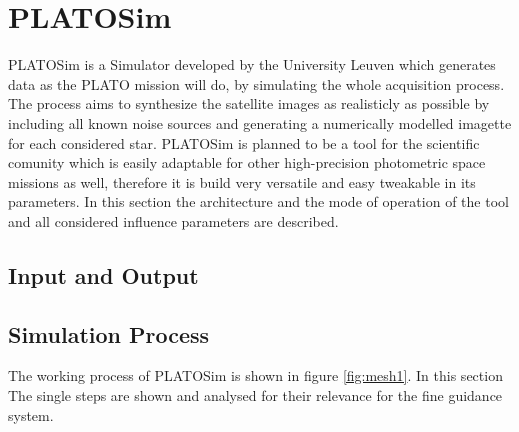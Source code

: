 \section{PLATOSim}
PLATOSim is a Simulator developed by the University Leuven which generates data as the PLATO mission will do, by simulating the whole acquisition process. The process aims to synthesize the satellite images as realisticly as possible by including all known noise sources and generating a numerically modelled imagette for each considered star. 
\newline
PLATOSim is planned to be a tool for the scientific comunity which is easily adaptable for other high-precision photometric space missions as well, therefore it is build very versatile and easy tweakable in its parameters.
\newline
In this section the architecture and the mode of operation of the tool and all considered influence parameters are described.
\subsection{Input and Output}

\subsection{Simulation Process}  
The working process of PLATOSim is shown in figure \ref{fig:mesh1}. In this section The single steps are shown and analysed for their relevance for the fine guidance system.
\newline

